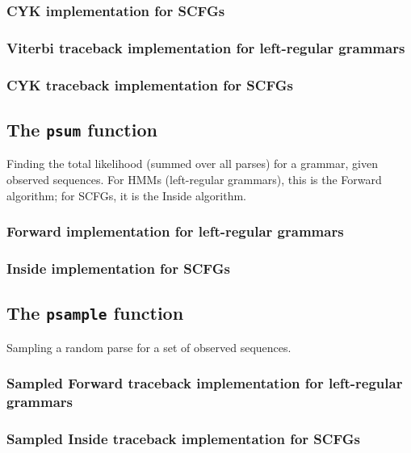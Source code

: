 \documentclass{article}
\begin{document}
\subsubsection{CYK implementation for SCFGs}

\subsubsection{Viterbi traceback implementation for left-regular grammars}

\subsubsection{CYK traceback implementation for SCFGs}

\subsection{The {\tt psum} function}

Finding the total likelihood (summed over all parses) for a grammar,
given observed sequences.
For HMMs (left-regular grammars), this is the Forward algorithm;
for SCFGs, it is the Inside algorithm.

\subsubsection{Forward implementation for left-regular grammars}

\subsubsection{Inside implementation for SCFGs}

\subsection{The {\tt psample} function}

Sampling a random parse for a set of observed sequences.

\subsubsection{Sampled Forward traceback implementation for left-regular grammars}

\subsubsection{Sampled Inside traceback implementation for SCFGs}
\end{document}
